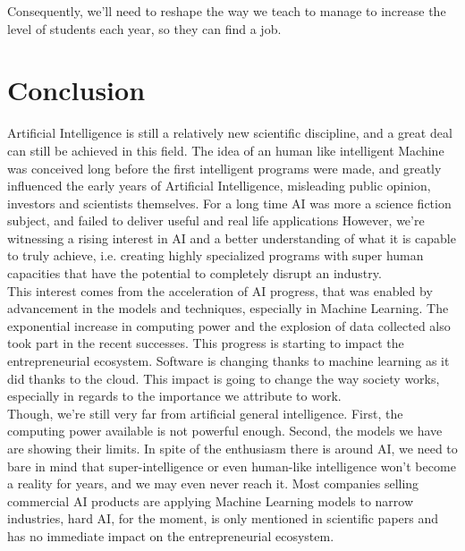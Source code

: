\documentclass[12pt]{article}
\begin{document}
Consequently, we'll need to reshape the way we teach to manage to increase the
level of students each year, so they can find a job.

\pagebreak


\section*{Conclusion}\label{conclusion}

\bigskip

Artificial Intelligence is still a relatively new scientific discipline, and a
great deal can still be achieved in this field. The idea of an human like
intelligent Machine was conceived long before the first intelligent programs
were made, and greatly influenced the early years of Artificial Intelligence,
misleading public opinion, investors and scientists themselves. For a long time
AI was more a science fiction subject, and failed to deliver useful and real
life applications However, we're witnessing a rising interest in AI and a better
understanding of what it  is capable to truly achieve, i.e. creating highly
specialized programs with super  human capacities that have the potential to
completely disrupt an industry.\\

This interest comes from the acceleration of AI progress, that was enabled by
advancement in the models and techniques, especially in Machine Learning. The
exponential increase in computing power and the explosion of data collected also
took part in the recent successes. This progress is starting to impact the
entrepreneurial ecosystem. Software is changing thanks to machine learning as
it did thanks to the cloud. This impact is going to change the way society
works, especially in regards to the  importance we attribute to work.\\

Though, we're still very far from artificial general intelligence. First, the
computing power available is not powerful enough. Second, the models we have are
showing their limits. In spite of the enthusiasm there is around AI, we need to
bare in mind that super-intelligence or even human-like intelligence won't
become a reality for years, and we may even never reach it. Most companies
selling commercial AI products are applying Machine Learning models to narrow
industries, hard AI, for the moment, is only mentioned in scientific papers and
has no immediate impact on the entrepreneurial ecosystem.\\
\end{document}
